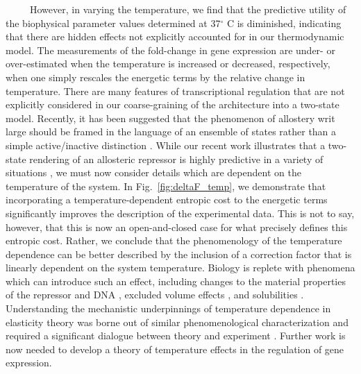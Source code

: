 \documentclass[12pt]{caltech_thesis}
\begin{document}
~~~~~However, in varying the temperature, we find that the predictive
utility of the biophysical parameter values determined at 37\(^\circ\) C
is diminished, indicating that there are hidden effects not explicitly
accounted for in our thermodynamic model. The measurements of the
fold-change in gene expression are under- or over-estimated when the
temperature is increased or decreased, respectively, when one simply
rescales the energetic terms by the relative change in temperature.
There are many features of transcriptional regulation that are not
explicitly considered in our coarse-graining of the architecture into a
two-state model. Recently, it has been suggested that the phenomenon of
allostery writ large should be framed in the language of an ensemble of
states rather than a simple active/inactive distinction
\autocite{motlagh2014}. While our recent work illustrates that a
two-state rendering of an allosteric repressor is highly predictive in a
variety of situations \autocite{razo-mejia2018,chure2019}, we must now
consider details which are dependent on the temperature of the system.
In Fig.~\ref{fig:deltaF_temp}, we demonstrate that incorporating a
temperature-dependent entropic cost to the energetic terms significantly
improves the description of the experimental data. This is not to say,
however, that this is now an open-and-closed case for what precisely
defines this entropic cost. Rather, we conclude that the phenomenology
of the temperature dependence can be better described by the inclusion
of a correction factor that is linearly dependent on the system
temperature. Biology is replete with phenomena which can introduce such
an effect, including changes to the material properties of the repressor
and DNA \autocite{goethe2015,mondal2011}, excluded volume effects
\autocite{driessen2014}, and solubilities
\autocite{elf2007,kao-huang1977,yakovchuk2006}. Understanding the
mechanistic underpinnings of temperature dependence in elasticity theory
was borne out of similar phenomenological characterization
\autocite{friedel1974} and required a significant dialogue between
theory and experiment \autocite{phillips2001}. Further work is now
needed to develop a theory of temperature effects in the regulation of
gene expression.
\end{document}
